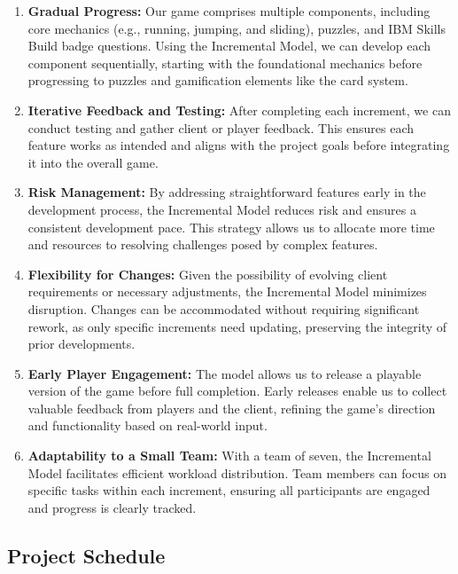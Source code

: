 \documentclass[11pt, a4paper]{article}
\begin{document}
\begin{enumerate}
    \item \textbf{Gradual Progress:} Our game comprises multiple components, including core mechanics (e.g., running, jumping, and sliding), puzzles, and IBM Skills Build badge questions. Using the Incremental Model, we can develop each component sequentially, starting with the foundational mechanics before progressing to puzzles and gamification elements like the card system.

    \item \textbf{Iterative Feedback and Testing:} After completing each increment, we can conduct testing and gather client or player feedback. This ensures each feature works as intended and aligns with the project goals before integrating it into the overall game.

    \item \textbf{Risk Management:} By addressing straightforward features early in the development process, the Incremental Model reduces risk and ensures a consistent development pace. This strategy allows us to allocate more time and resources to resolving challenges posed by complex features.

    \item \textbf{Flexibility for Changes:} Given the possibility of evolving client requirements or necessary adjustments, the Incremental Model minimizes disruption. Changes can be accommodated without requiring significant rework, as only specific increments need updating, preserving the integrity of prior developments.

    \item \textbf{Early Player Engagement:} The model allows us to release a playable version of the game before full completion. Early releases enable us to collect valuable feedback from players and the client, refining the game’s direction and functionality based on real-world input.

    \item \textbf{Adaptability to a Small Team:} With a team of seven, the Incremental Model facilitates efficient workload distribution. Team members can focus on specific tasks within each increment, ensuring all participants are engaged and progress is clearly tracked.
\end{enumerate}

\subsection{Project Schedule}
\end{document}

